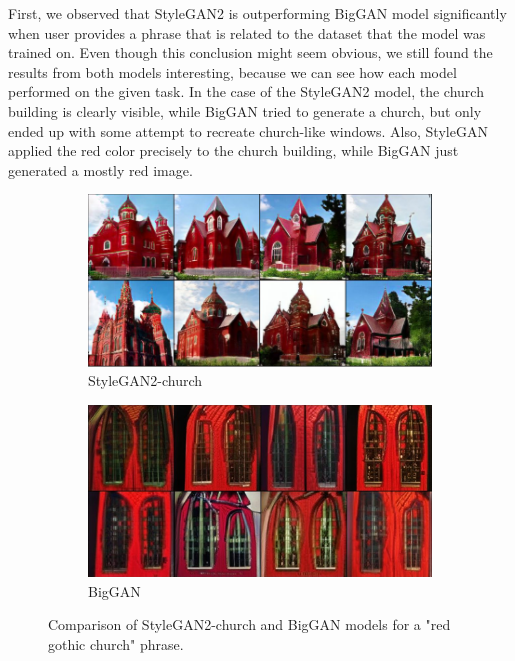 \documentclass[12pt,a4paper,openany]{book}
\begin{document}
\noindent First, we observed that StyleGAN2 is outperforming BigGAN model significantly when user provides a phrase that is related to the dataset that the model was trained on. Even though this conclusion might seem obvious, we still found the results from both models interesting, because we can see how each model performed on the given task. In the case of the StyleGAN2 model, the church building is clearly visible, while BigGAN tried to generate a church, but only ended up with some attempt to recreate church-like windows. Also, StyleGAN applied the red color precisely to the church building, while BigGAN just generated a mostly red image.
\begin{figure}[H]
\centering
\begin{subfigure}[b]{0.8\textwidth}
   \includegraphics[width=1\linewidth, scale=0.2]{redgothic_stylegan.PNG}
   \caption{StyleGAN2-church}
   \label{fig:Ng1} 
\end{subfigure}

\begin{subfigure}[b]{0.8\textwidth}
   \includegraphics[width=1\linewidth, scale=0.2]{redgothic_biggan.PNG}
   \caption{BigGAN}
   \label{fig:Ng2}
\end{subfigure}
\caption[pics]{Comparison of StyleGAN2-church and BigGAN models for a "red gothic church" phrase.}
\end{figure}
\end{document}

